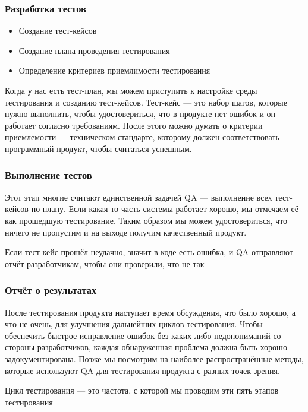 \documentclass{../industrial-development}
\begin{document}
	\begin{frame} \frametitle{Разработка тестов}
		\begin{itemize}
			\item Создание тест-кейсов
			\item Создание плана проведения тестирования
			\item Определение критериев приемлимости тестирования
		\end{itemize}
	Когда у нас есть тест-план, мы можем приступить к настройке среды тестирования и созданию тест-кейсов. Тест-кейс --- это набор шагов, которые нужно выполнить, чтобы удостовериться, что в продукте нет ошибок и он работает согласно требованиям. После этого можно думать о критерии приемлемости — техническом стандарте, которому должен соответствовать программный продукт, чтобы считаться успешным.
	\end{frame}
	
	\begin{frame} \frametitle{Выполнение тестов}
	Этот этап многие считают единственной задачей QA --- выполнение всех тест-кейсов по плану. Если какая-то часть системы работает хорошо, мы отмечаем её как прошедшую тестирование. Таким образом мы можем удостовериться, что ничего не пропустим и на выходе получим качественный продукт.
	
	Если тест-кейс прошёл неудачно, значит в коде есть ошибка, и QA отправляют отчёт разработчикам, чтобы они проверили, что не так
	\end{frame}
	
	\begin{frame} \frametitle{Отчёт о результатах}
	После тестирования продукта наступает время обсуждения, что было хорошо, а что не очень, для улучшения дальнейших циклов тестирования. Чтобы обеспечить быстрое исправление ошибок без каких-либо недопониманий со стороны разработчиков, каждая обнаруженная проблема должна быть хорошо задокументирована. Позже мы посмотрим на наиболее распространённые методы, которые используют QA для тестирования продукта с разных точек зрения.
	
	Цикл тестирования --- это частота, с которой мы проводим эти пять этапов тестирования
	\end{frame}
\end{document}
